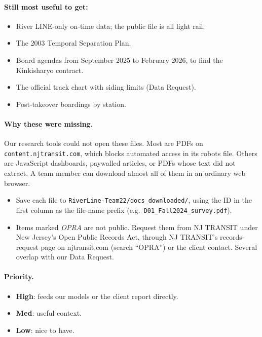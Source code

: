 \documentclass[10.5pt]{article}
\newcommand{\Hi}{\textcolor{hi}{\textbf{High}}}\newcommand{\Md}{\textcolor{md}{\textbf{Med}}}\newcommand{\Lo}{\textcolor{lo}{\textbf{Low}}}
\begin{document}
\paragraph{Still most useful to get:}
\begin{itemize}
\item River LINE-only on-time data; the public file is all light rail.
\item The 2003 Temporal Separation Plan.
\item Board agendas from September 2025 to February 2026, to find the Kinkisharyo contract.
\item The official track chart with siding limits (Data Request).
\item Post-takeover boardings by station.
\end{itemize}

\paragraph{Why these were missing.} Our research tools could not open these files. Most are PDFs on \texttt{content.njtransit.com}, which blocks automated access in its robots file. Others are JavaScript dashboards, paywalled articles, or PDFs whose text did not extract. A team member can download almost all of them in an ordinary web browser.
\begin{itemize}
\item Save each file to \texttt{RiverLine-Team22/docs\_downloaded/}, using the ID in the first column as the file-name prefix (e.g.\ \texttt{D01\_Fall2024\_survey.pdf}).
\item Items marked \emph{OPRA} are not public. Request them from NJ TRANSIT under New Jersey's Open Public Records Act, through NJ TRANSIT's records-request page on njtransit.com (search ``OPRA'') or the client contact. Several overlap with our Data Request.
\end{itemize}

\paragraph{Priority.}
\begin{itemize}
\item \Hi: feeds our models or the client report directly.
\item \Md: useful context.
\item \Lo: nice to have.
\end{itemize}
\end{document}
